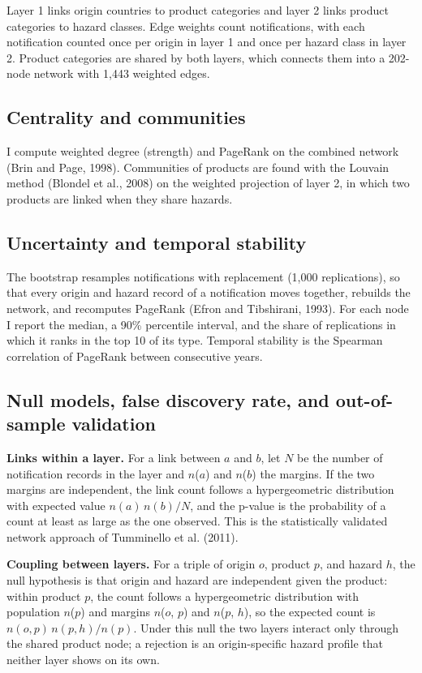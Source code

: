 \documentclass[11pt]{article}
\begin{document}
Layer 1 links origin countries to product categories and layer 2 links product categories to hazard classes. Edge weights count notifications, with each notification counted once per origin in layer 1 and once per hazard class in layer 2. Product categories are shared by both layers, which connects them into a 202-node network with 1,443 weighted edges.

\subsection{Centrality and communities}

I compute weighted degree (strength) and PageRank on the combined network (Brin and Page, 1998). Communities of products are found with the Louvain method (Blondel et al., 2008) on the weighted projection of layer 2, in which two products are linked when they share hazards.

\subsection{Uncertainty and temporal stability}

The bootstrap resamples notifications with replacement (1,000 replications), so that every origin and hazard record of a notification moves together, rebuilds the network, and recomputes PageRank (Efron and Tibshirani, 1993). For each node I report the median, a 90\% percentile interval, and the share of replications in which it ranks in the top 10 of its type. Temporal stability is the Spearman correlation of PageRank between consecutive years.

\subsection{Null models, false discovery rate, and out-of-sample validation}

\textbf{Links within a layer.} For a link between $a$ and $b$, let $N$ be the number of notification records in the layer and $n$($a$) and $n$($b$) the margins. If the two margins are independent, the link count follows a hypergeometric distribution with expected value $n(a)\,n(b)/N$, and the p-value is the probability of a count at least as large as the one observed. This is the statistically validated network approach of Tumminello et al. (2011).

\textbf{Coupling between layers.} For a triple of origin $o$, product $p$, and hazard $h$, the null hypothesis is that origin and hazard are independent given the product: within product $p$, the count follows a hypergeometric distribution with population $n$($p$) and margins $n$($o$, $p$) and $n$($p$, $h$), so the expected count is $n(o,p)\,n(p,h)/n(p)$. Under this null the two layers interact only through the shared product node; a rejection is an origin-specific hazard profile that neither layer shows on its own.
\end{document}
